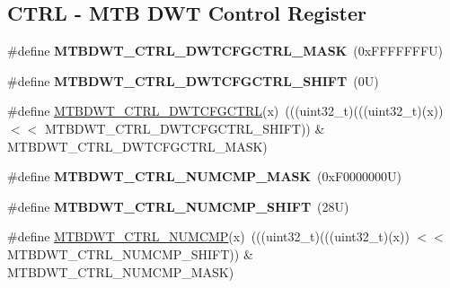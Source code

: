 \subsection*{C\+T\+RL -\/ M\+TB D\+WT Control Register}
\begin{DoxyCompactItemize}
\item 
\mbox{\label{group___m_t_b_d_w_t___register___masks_ga9e40278e7b92b2e6b986112b6e2dddc3}} 
\#define {\bfseries M\+T\+B\+D\+W\+T\+\_\+\+C\+T\+R\+L\+\_\+\+D\+W\+T\+C\+F\+G\+C\+T\+R\+L\+\_\+\+M\+A\+SK}~(0x\+F\+F\+F\+F\+F\+F\+F\+U)
\item 
\mbox{\label{group___m_t_b_d_w_t___register___masks_gad6dd05558d41419cb9f877533730598a}} 
\#define {\bfseries M\+T\+B\+D\+W\+T\+\_\+\+C\+T\+R\+L\+\_\+\+D\+W\+T\+C\+F\+G\+C\+T\+R\+L\+\_\+\+S\+H\+I\+FT}~(0\+U)
\item 
\#define \mbox{\hyperlink{group___m_t_b_d_w_t___register___masks_ga751a2e34d1e0f6ef6c755be288a29451}{M\+T\+B\+D\+W\+T\+\_\+\+C\+T\+R\+L\+\_\+\+D\+W\+T\+C\+F\+G\+C\+T\+RL}}(x)~(((uint32\+\_\+t)(((uint32\+\_\+t)(x)) $<$$<$ M\+T\+B\+D\+W\+T\+\_\+\+C\+T\+R\+L\+\_\+\+D\+W\+T\+C\+F\+G\+C\+T\+R\+L\+\_\+\+S\+H\+I\+FT)) \& M\+T\+B\+D\+W\+T\+\_\+\+C\+T\+R\+L\+\_\+\+D\+W\+T\+C\+F\+G\+C\+T\+R\+L\+\_\+\+M\+A\+SK)
\item 
\mbox{\label{group___m_t_b_d_w_t___register___masks_ga846eb798600a6cbb83fb5343120b87e6}} 
\#define {\bfseries M\+T\+B\+D\+W\+T\+\_\+\+C\+T\+R\+L\+\_\+\+N\+U\+M\+C\+M\+P\+\_\+\+M\+A\+SK}~(0x\+F0000000\+U)
\item 
\mbox{\label{group___m_t_b_d_w_t___register___masks_ga8ae4e5abf11db57b34a826de0cd5e562}} 
\#define {\bfseries M\+T\+B\+D\+W\+T\+\_\+\+C\+T\+R\+L\+\_\+\+N\+U\+M\+C\+M\+P\+\_\+\+S\+H\+I\+FT}~(28\+U)
\item 
\#define \mbox{\hyperlink{group___m_t_b_d_w_t___register___masks_ga97447cbbfbb879c90c4072c4c4086254}{M\+T\+B\+D\+W\+T\+\_\+\+C\+T\+R\+L\+\_\+\+N\+U\+M\+C\+MP}}(x)~(((uint32\+\_\+t)(((uint32\+\_\+t)(x)) $<$$<$ M\+T\+B\+D\+W\+T\+\_\+\+C\+T\+R\+L\+\_\+\+N\+U\+M\+C\+M\+P\+\_\+\+S\+H\+I\+FT)) \& M\+T\+B\+D\+W\+T\+\_\+\+C\+T\+R\+L\+\_\+\+N\+U\+M\+C\+M\+P\+\_\+\+M\+A\+SK)
\end{DoxyCompactItemize}
